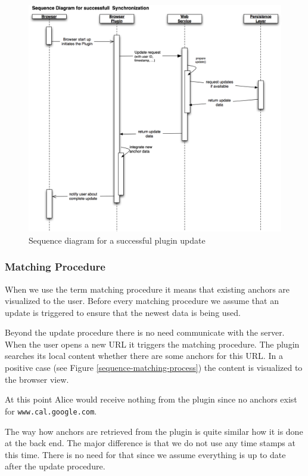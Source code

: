\begin{figure}\centering
		\includegraphics[width=13cm]{images/sequence-update.png}
		\caption{Sequence diagram for a successful plugin update}
		\label{sequence-update}
\end{figure} 

\subsubsection{Matching Procedure}
When we use the term matching procedure it means that existing anchors are visualized to the user. Before every matching procedure we assume that an update is triggered to ensure that the newest data is being used. 

Beyond the update procedure there is no need communicate with the server. When the user opens a new URL it triggers the matching procedure. The plugin searches its local content whether there are some anchors for this URL. In a positive case (see Figure \ref{sequence-matching-process}) the content is visualized to the browser view. 

At this point Alice would receive nothing from the plugin since no anchors exist for \verb+www.cal.google.com+. 

The way how anchors are retrieved from the plugin is quite similar how it is done at the back end. The major difference is that we do not use any time stamps at this time. There is no need for that since we assume everything is up to date after the update procedure. 

